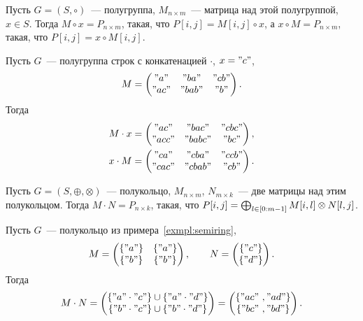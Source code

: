 \begin{definition}
    Пусть $G = (S, \circ)$~--- полугруппа, $M_{n \times m}$~--- матрица над этой полугруппой, $x \in S$.
    Тогда $ M \circ x = P_{n \times m}$, такая, что $P[i, j] = M[i, j] \circ x$, а $x \circ M = P_{n \times m}$, такая, что $P[i, j] = x \circ M[i, j]$.
\end{definition}

\begin{example}
    Пусть $G$~--- полугруппа строк с конкатенацией $\cdot$, $x = "c"$,
    \[
        M =
        \begin{pmatrix}
            "a"  & "ba"  & "cb" \\
            "ac" & "bab" & "b"
        \end{pmatrix}.
    \]
    Тогда
    \begin{gather*}
        M \cdot x =
        \begin{pmatrix}
            "ac"  & "bac"  & "cbc" \\
            "acc" & "babc" & "bc"
        \end{pmatrix},\\
        x \cdot M =
        \begin{pmatrix}
            "ca"  & "cba"  & "ccb" \\
            "cac" & "cbab" & "cb"
        \end{pmatrix}.
    \end{gather*}
\end{example}

\begin{definition}
    \label{def:MxM}
    Пусть $G = (S, \oplus, \otimes)$~--- полукольцо, $M_{n \times m}$, $N_{m\times k}$~--- две матрицы над этим полукольцом.
    Тогда $M \cdot N = P_{n \times k}$, такая, что $P[i, j] = \bigoplus_{l \in [0 \rng m - 1]} M[i, l] \otimes N[l, j]$.
\end{definition}

\begin{example}
    Пусть $G$~--- полукольцо из примера~\ref{exmpl:semiring},
    \[
        M =
        \begin{pmatrix}
            \{"a"\} & \{"a"\} \\
            \{"b"\} & \{"b"\}
        \end{pmatrix},
        \qquad
        N =
        \begin{pmatrix}
            \{"c"\} \\
            \{"d"\}
        \end{pmatrix}.
    \]
    Тогда
    \[
        M \cdot N =
        \begin{pmatrix}
            \{"a" \cdot "c"\} \cup \{"a" \cdot "d"\} \\
            \{"b" \cdot "c"\} \cup \{"b" \cdot "d"\}
        \end{pmatrix}=
        \begin{pmatrix}
            \{"ac" \ ,  "ad"\} \\
            \{"bc" \ , "bd"\}
        \end{pmatrix}.
    \]
\end{example}

